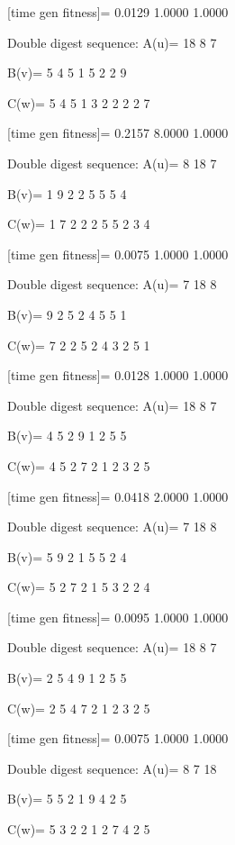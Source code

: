 [time gen fitness]=
    0.0129    1.0000    1.0000

Double digest sequence:
A(u)=
    18     8     7

B(v)=
     5     4     5     1     5     2     2     9

C(w)=
     5     4     5     1     3     2     2     2     2     7

[time gen fitness]=
    0.2157    8.0000    1.0000

Double digest sequence:
A(u)=
     8    18     7

B(v)=
     1     9     2     2     5     5     5     4

C(w)=
     1     7     2     2     2     5     5     2     3     4

[time gen fitness]=
    0.0075    1.0000    1.0000

Double digest sequence:
A(u)=
     7    18     8

B(v)=
     9     2     5     2     4     5     5     1

C(w)=
     7     2     2     5     2     4     3     2     5     1

[time gen fitness]=
    0.0128    1.0000    1.0000

Double digest sequence:
A(u)=
    18     8     7

B(v)=
     4     5     2     9     1     2     5     5

C(w)=
     4     5     2     7     2     1     2     3     2     5

[time gen fitness]=
    0.0418    2.0000    1.0000

Double digest sequence:
A(u)=
     7    18     8

B(v)=
     5     9     2     1     5     5     2     4

C(w)=
     5     2     7     2     1     5     3     2     2     4

[time gen fitness]=
    0.0095    1.0000    1.0000

Double digest sequence:
A(u)=
    18     8     7

B(v)=
     2     5     4     9     1     2     5     5

C(w)=
     2     5     4     7     2     1     2     3     2     5

[time gen fitness]=
    0.0075    1.0000    1.0000

Double digest sequence:
A(u)=
     8     7    18

B(v)=
     5     5     2     1     9     4     2     5

C(w)=
     5     3     2     2     1     2     7     4     2     5

